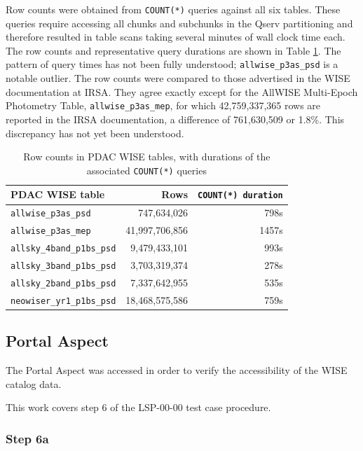 \documentclass[DM,lsstdraft,STR,toc]{lsstdoc}
\begin{document}
Row counts were obtained from \verb|COUNT(*)| queries against all six tables.
These queries require accessing all chunks and subchunks in the Qserv partitioning and therefore resulted in table scans taking several minutes of wall clock time each.
The row counts and representative query durations are shown in Table \ref{tab:wisetablerows}.
The pattern of query times has not been fully understood; \verb|allwise_p3as_psd| is a notable outlier.
The row counts were compared to those advertised in the WISE documentation at IRSA.
They agree exactly except for the AllWISE Multi-Epoch Photometry Table, \verb|allwise_p3as_mep|, for which 42,759,337,365 rows are reported in the IRSA documentation, a difference of 761,630,509 or 1.8\%.
This discrepancy has not yet been understood.

\begin{table}[h]
\centering
\begin{tabular}{l r r}
PDAC WISE table & Rows & \texttt{COUNT(*) duration} \\ \hline
\verb|allwise_p3as_psd| & 747,634,026 & 798s \\
\verb|allwise_p3as_mep| & 41,997,706,856 & 1457s \\
\verb|allsky_4band_p1bs_psd| & 9,479,433,101 & 993s \\
\verb|allsky_3band_p1bs_psd| & 3,703,319,374 & 278s \\
\verb|allsky_2band_p1bs_psd| & 7,337,642,955 & 535s \\
\verb|neowiser_yr1_p1bs_psd| & 18,468,575,586 & 759s \\
\end{tabular}
\caption{Row counts in PDAC WISE tables, with durations of the associated \texttt{COUNT(*)} queries}
\label{tab:wisetablerows}
\end{table}

\subsection{Portal Aspect}
\label{sect:lsp-00-00-portal}

The Portal Aspect was accessed in order to verify the accessibility of the WISE catalog data.

This work covers step 6 of the LSP-00-00 test case procedure.

\subsubsection{Step 6a}
\end{document}
